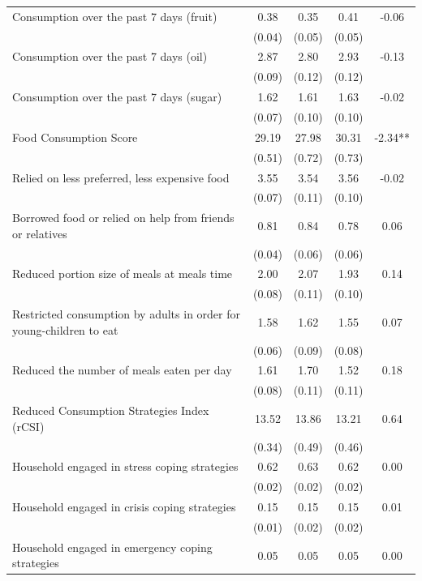\begin{tabular}{@{\extracolsep{5pt}}lcccc}
Consumption over the past 7 days (fruit)   & 0.38    & 0.35    & 0.41    & -0.06   \\
 & (0.04)  & (0.05)  & (0.05)  &  \\ [1ex]
Consumption over the past 7 days (oil)   & 2.87    & 2.80    & 2.93    & -0.13   \\
 & (0.09)  & (0.12)  & (0.12)  &  \\ [1ex]
Consumption over the past 7 days (sugar)   & 1.62    & 1.61    & 1.63    & -0.02   \\
 & (0.07)  & (0.10)  & (0.10)  &  \\ [1ex]
Food Consumption Score   & 29.19    & 27.98    & 30.31    & -2.34**   \\
 & (0.51)  & (0.72)  & (0.73)  &  \\ [1ex]
Relied on less preferred, less expensive food   & 3.55    & 3.54    & 3.56    & -0.02   \\
 & (0.07)  & (0.11)  & (0.10)  &  \\ [1ex]
Borrowed food or relied on help from friends or relatives   & 0.81    & 0.84    & 0.78    & 0.06   \\
 & (0.04)  & (0.06)  & (0.06)  &  \\ [1ex]
Reduced portion size of meals at meals time   & 2.00    & 2.07    & 1.93    & 0.14   \\
 & (0.08)  & (0.11)  & (0.10)  &  \\ [1ex]
Restricted consumption by adults in order for young-children to eat   & 1.58    & 1.62    & 1.55    & 0.07   \\
 & (0.06)  & (0.09)  & (0.08)  &  \\ [1ex]
Reduced the number of meals eaten per day   & 1.61    & 1.70    & 1.52    & 0.18   \\
 & (0.08)  & (0.11)  & (0.11)  &  \\ [1ex]
Reduced Consumption Strategies Index (rCSI)   & 13.52    & 13.86    & 13.21    & 0.64   \\
 & (0.34)  & (0.49)  & (0.46)  &  \\ [1ex]
Household engaged in stress coping strategies   & 0.62    & 0.63    & 0.62    & 0.00   \\
 & (0.02)  & (0.02)  & (0.02)  &  \\ [1ex]
Household engaged in crisis coping strategies   & 0.15    & 0.15    & 0.15    & 0.01   \\
 & (0.01)  & (0.02)  & (0.02)  &  \\ [1ex]
Household engaged in emergency coping strategies   & 0.05    & 0.05    & 0.05    & 0.00   \\

\end{tabular}
